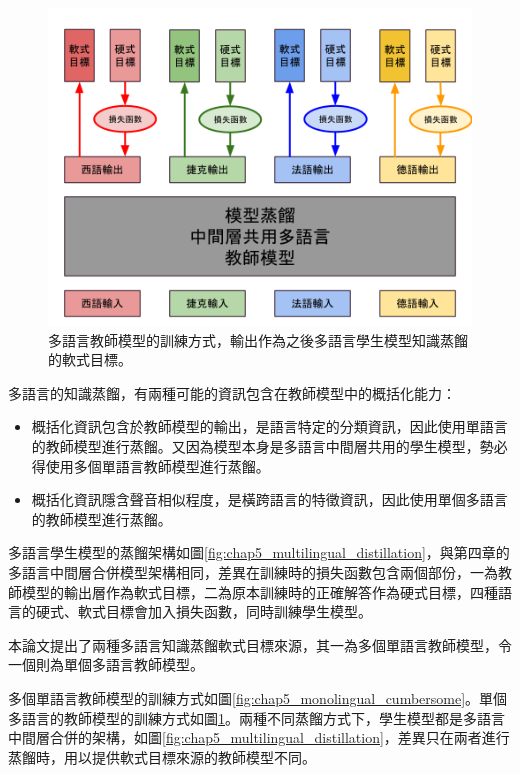 \begin{figure}[!ht]
\centering
\includegraphics[scale=0.35]{images/chap5_multilingual_cumbersome.png}
\caption{多語言教師模型的訓練方式，輸出作為之後多語言學生模型知識蒸餾的軟式目標。}
\label{fig:chap5_multilingual_cumbersome}
\end{figure}

多語言的知識蒸餾，有兩種可能的資訊包含在教師模型中的概括化能力：
\begin{itemize}
 \itemsep -2pt
 \item 概括化資訊包含於教師模型的輸出，是語言特定的分類資訊，因此使用單語言的教師模型進行蒸餾。又因為模型本身是多語言中間層共用的學生模型，勢必得使用多個單語言教師模型進行蒸餾。
 \item 概括化資訊隱含聲音相似程度，是橫跨語言的特徵資訊，因此使用單個多語言的教師模型進行蒸餾。
\end{itemize}

多語言學生模型的蒸餾架構如圖\ref{fig:chap5_multilingual_distillation}，與第四章的多語言中間層合併模型架構相同，差異在訓練時的損失函數包含兩個部份，一為教師模型的輸出層作為軟式目標，二為原本訓練時的正確解答作為硬式目標，四種語言的硬式、軟式目標會加入損失函數，同時訓練學生模型。

本論文提出了兩種多語言知識蒸餾軟式目標來源，其一為多個單語言教師模型，令一個則為單個多語言教師模型。

多個單語言教師模型的訓練方式如圖\ref{fig:chap5_monolingual_cumbersome}。單個多語言的教師模型的訓練方式如圖\ref{fig:chap5_multilingual_cumbersome}。兩種不同蒸餾方式下，學生模型都是多語言中間層合併的架構，如圖\ref{fig:chap5_multilingual_distillation}，差異只在兩者進行蒸餾時，用以提供軟式目標來源的教師模型不同。

